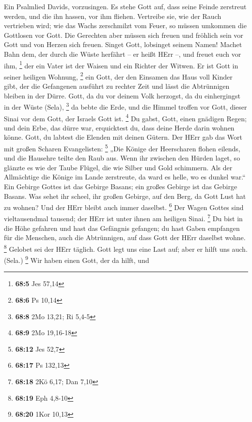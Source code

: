  Ein Psalmlied Davids, vorzusingen.  Es
stehe Gott auf, dass seine Feinde zerstreut werden, und die ihn hassen,
vor ihm fliehen.  Vertreibe sie, wie der Rauch vertrieben
wird; wie das Wachs zerschmilzt vom Feuer, so müssen umkommen die
Gottlosen vor Gott.  Die Gerechten aber müssen sich freuen
und fröhlich sein vor Gott und von Herzen sich freuen. 
Singet Gott, lobsinget seinem Namen! Machet Bahn dem, der durch die
Wüste herfährt -- er heißt HErr --, und freuet euch vor ihm, \footnote{\textbf{68:5}
  Jes 57,14}  der ein Vater ist der Waisen und ein Richter
der Witwen. Er ist Gott in seiner heiligen Wohnung, \footnote{\textbf{68:6}
  Ps 10,14}  ein Gott, der den Einsamen das Haus voll
Kinder gibt, der die Gefangenen ausführt zu rechter Zeit und lässt die
Abtrünnigen bleiben in der Dürre.  Gott, da du vor deinem
Volk herzogst, da du einhergingst in der Wüste (Sela), \footnote{\textbf{68:8}
  2Mo 13,21; Ri 5,4-5}  da bebte die Erde, und die Himmel
troffen vor Gott, dieser Sinai vor dem Gott, der Israels Gott ist.
\footnote{\textbf{68:9} 2Mo 19,16-18}  Du gabst, Gott,
einen gnädigen Regen; und dein Erbe, das dürre war, erquicktest du,
 dass deine Herde darin wohnen könne. Gott, du labtest
die Elenden mit deinen Gütern.  Der HErr gab das Wort mit
großen Scharen Evangelisten: \footnote{\textbf{68:12} Jes 52,7}
 „Die Könige der Heerscharen flohen eilends, und die
Hausehre teilte den Raub aus.  Wenn ihr zwischen den
Hürden laget, so glänzte es wie der Taube Flügel, die wie Silber und
Gold schimmern.  Als der Allmächtige die Könige im Lande
zerstreute, da ward es helle, wo es dunkel war.``  Ein
Gebirge Gottes ist das Gebirge Basans; ein großes Gebirge ist das
Gebirge Basans.  Was sehet ihr scheel, ihr großen
Gebirge, auf den Berg, da Gott Lust hat zu wohnen? Und der HErr bleibt
auch immer daselbst. \footnote{\textbf{68:17} Ps 132,13} 
Der Wagen Gottes sind vieltausendmal tausend; der HErr ist unter ihnen
am heiligen Sinai. \footnote{\textbf{68:18} 2Kö 6,17; Dan 7,10}
 Du bist in die Höhe gefahren und hast das Gefängnis
gefangen; du hast Gaben empfangen für die Menschen, auch die
Abtrünnigen, auf dass Gott der HErr daselbst wohne. \footnote{\textbf{68:19}
  Eph 4,8-10}  Gelobet sei der HErr täglich. Gott legt
uns eine Last auf; aber er hilft uns auch. (Sela.) \footnote{\textbf{68:20}
  1Kor 10,13}  Wir haben einen Gott, der da hilft, und
